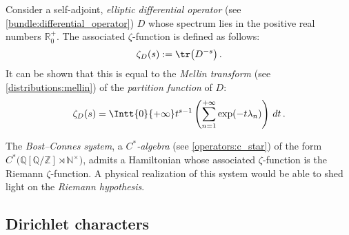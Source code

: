    \begin{example}
        Consider a self-adjoint, \textit{elliptic differential operator} (see \cref{bundle:differential_operator}) $D$ whose spectrum lies in the positive real numbers $\mathbb{R}^+_0$. The associated $\zeta$-function is defined as follows:
        \begin{gather}
            \zeta_D(s) := \tr\bigl(D^{-s}\bigr)\,.
        \end{gather}
        It can be shown that this is equal to the \textit{Mellin transform} (see \cref{distributions:mellin}) of the \textit{partition function} of $D$:
        \begin{gather}
            \zeta_D(s) = \Intt{0}{+\infty}t^{s-1}\left(\sum_{n=1}^{+\infty}\exp(-t\lambda_n)\right)\,dt\,.
        \end{gather}
    \end{example}
    \begin{remark}
        The \textit{Bost--Connes system}, a \textit{$C^*$-algebra} (see \cref{operators:c_star}) of the form $C^*\bigl(\mathbb{Q}[\mathbb{Q}/\mathbb{Z}]\rtimes\mathbb{N}^\times\bigr)$, admits a Hamiltonian whose associated $\zeta$-function is the Riemann $\zeta$-function. A physical realization of this system would be able to shed light on the \textit{Riemann hypothesis}.
    \end{remark}

\subsection{Dirichlet characters}

